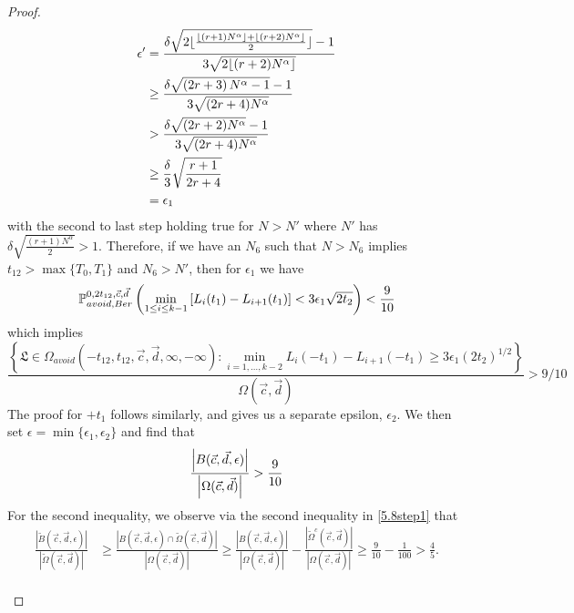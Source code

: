 \begin{proof}
	\begin{align*}
	\epsilon'
	&=\frac{\delta\sqrt{2\floor{\frac{\floor{(r+1)N^\alpha}+\floor{(r+2)N^\alpha}}2}}-1}{3\sqrt{2\floor{(r+2)N^\alpha}}}\\
	&\geq\frac{\delta\sqrt{\left(2r+3\right)N^\alpha-1}-1}{3\sqrt{(2r+4)N^\alpha}}\\
	&>\frac{\delta\sqrt{(2r+2)N^\alpha}-1}{3\sqrt{(2r+4)N^\alpha}}\\
	&\geq\frac{\delta}{3}\sqrt{\frac{r+1}{2r+4}}\\
	&=\epsilon_1
	\end{align*}
	with the second to last step holding true for $N>N'$ where $N'$ has $\delta\sqrt{\frac{(r+1)N^\alpha}{2}}>1$. Therefore, if we have an $N_6$ such that $N>N_6$ implies $t_{12}>\max\{T_0,T_1\}$ and $N_6>N'$, then for $\epsilon_1$ we have
	\[
	\pr^{0,2t_{12},\vec c, \vec d}_{avoid,Ber}\left(\min_{1\leq i\leq k-1} \left[L_i(t_1)-L_{i+1}(t_1)\right]<3\epsilon_1\sqrt{2t_2}\right)<\frac{9}{10}
	\]
	which implies
	$$\frac{\left\{ \mathfrak{L} \in \Omega_{avoid}(-t_{12}, t_{12}, \vec{c}, \vec{d}, \infty, -\infty): \min_{i = 1, \dots, k-2} L_{i}(- t_1) - L_{i+1}(-t_1) \geq 3\epsilon_1 (2t_2)^{1/2} \right\}}{\Omega(\vec c,\vec d)}>9/10$$ The proof for $+t_1$ follows similarly, and gives us a separate epsilon, $\epsilon_2$. We then set $\epsilon=\min\{\epsilon_1,\epsilon_2\}$ and find that $$\frac{\abs*{B(\vec c, \vec d, \epsilon)}}{\abs*{\Omega(\vec c, \vec d)}}>\frac{9}{10}$$ 
	For the second inequality, we observe via the second inequality in \eqref{5.8step1} that
	\begin{align*}
	\frac{|\tilde{B}(\vec{c},\vec{d},\epsilon)|}{|\tilde{\Omega}(\vec{c},\vec{d})|} &\geq \frac{|B(\vec{c},\vec{d},\epsilon)\cap\tilde{\Omega}(\vec{c},\vec{d})|}{|\Omega(\vec{c},\vec{d})|} \geq \frac{|B(\vec{c},\vec{d},\epsilon)|}{|\Omega(\vec{c},\vec{d})|} -\frac{|\tilde{\Omega}^c(\vec{c},\vec{d})|}{|\Omega(\vec{c},\vec{d})|} \geq \frac{9}{10} - \frac{1}{100} > \frac{4}{5}.
	\end{align*} \\
	

\end{proof}
